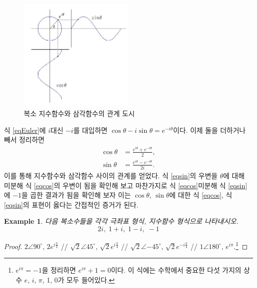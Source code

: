 \documentclass[a4paper, nobookmarks, subfigure, adjustmath, amsmath]{oblivoir}
\newtheorem{example}{Example}
\begin{document}
\begin{figure}[!hbp]
\centering
\includegraphics[width=0.5\textwidth]{sinevsexponential}
\caption{복소 지수함수와 삼각함수의 관계 도시}
\end{figure}

식 \eqref{eqEuler}에 $i$대신 $-i$를 대입하면 $\cos\theta - i\sin\theta = e^{-i\theta}$이다. 이제 둘을 더하거나 빼서 정리하면
\begin{align}
\cos\theta &= \frac{e^{i\theta} + e^{-i\theta}}{2}, \label{eqcos}\\
\sin\theta &= \frac{e^{i\theta} - e^{-i\theta}}{2i}. \label{eqsin}
\end{align}
이를 통해 지수함수와 삼각함수 사이의 관계를 얻었다. 식 \eqref{eqsin}의 우변을 $\theta$에 대해 미분해 식 \eqref{eqcos}의 우변이 됨을 확인해 보고 마찬가지로 식 \eqref{eqcos}\을 미분해 식 \eqref{eqsin}에 $-1$을 곱한 결과가 됨을 확인해 보자 이는 $\cos\theta$, $\sin\theta$에 대한 식 \eqref{eqcos}, 식 \eqref{eqsin}의 표현이 옳다는 간접적인 증거가 된다.

\begin{example}
다음 복소수들을 각각 극좌표 형식, 지수함수 형식으로 나타내시오.
\[ 2i,\; 1+i,\; 1-i,\; -1 \]
\end{example}

\begin{proof}
$2 \angle 90^{\circ}$, $2 e^{i \frac{\pi}{2}}$ // $\sqrt{2} \angle 45^{\circ}$, $\sqrt{2}e^{i\frac{\pi}{4}}$ // $\sqrt{2} \angle{-45^{\circ}}$, $\sqrt{2}e^{-i\frac{\pi}{4}}$ // $1\angle 180^{\circ}$, $e^{i\pi}$.\footnote{$e^{i\pi} = -1$을 정리하면 $e^{i\pi}+1 = 0$이다. 이 식에는 수학에서 중요한 다섯 가지의 상수 $e$, $i$, $\pi$, 1, 0가 모두 들어있다.}
\end{proof}
\end{document}
